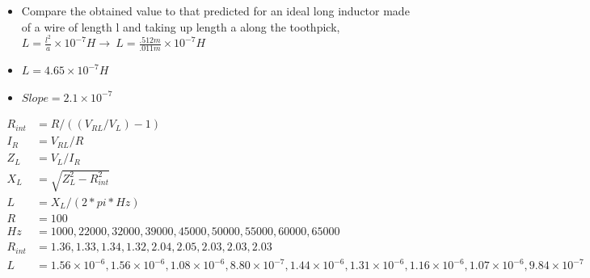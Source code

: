 \documentclass{article}
\def\F#1{\(#1\)}
\begin{document}
\begin{itemize}
  \item Compare the obtained value to that predicted for an ideal long inductor made of a wire of length l and taking up length a along the toothpick, \F{L=\frac{l^2}{a}\times{10}^{-7}H\rightarrow~L=\frac{.512 m}{.011 m}\times{10}^{-7}H}
  \item \F{L=\boxed{4.65\times{10}^{-7}H}}
  \item \F{Slope = \boxed{2.1\times{10}^{- 7}}}
\end{itemize}
\begin{align*}
  R_{int} &= R/((V_{RL}/V_{L}) - 1)\\
  I_R &= V_{RL} / R\\
  Z_L &= V_L / I_R\\
  X_L &= \sqrt{ Z_L^2 - R_{int}^2}\\
  L &= X_L / (2 * pi * Hz)\\
  R &= 100\\
  Hz &= 1000,22000,32000,39000,45000,50000,55000,60000,65000\\
  R_{int} &= 1.36, 1.33, 1.34, 1.32, 2.04, 2.05, 2.03, 2.03, 2.03\\
  L &= 1.56\times{10}^{-6},1.56\times{10}^{-6},1.08\times{10}^{-6},8.80\times{10}^{-7},1.44\times{10}^{-6},1.31\times{10}^{-6},1.16\times{10}^{-6},1.07\times{10}^{-6},9.84\times{10}^{-7}\\
\end{align*}
\end{document}
